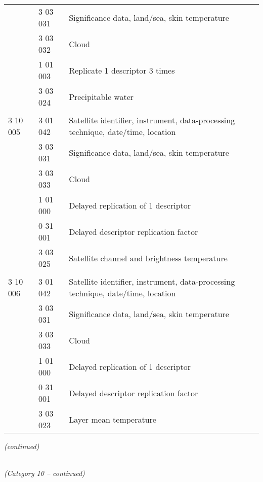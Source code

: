 \begin{longtable}[]{@{}llll@{}}
& 3 03 031 & Significance data, land/sea, skin temperature &\tabularnewline
& 3 03 032 & Cloud &\tabularnewline
& 1 01 003 & Replicate 1 descriptor 3 times &\tabularnewline
& 3 03 024 & Precipitable water &\tabularnewline
& & &\tabularnewline
3 10 005 & 3 01 042 & Satellite identifier, instrument, data-processing technique, date/time, location &\tabularnewline
& 3 03 031 & Significance data, land/sea, skin temperature &\tabularnewline
& 3 03 033 & Cloud &\tabularnewline
& 1 01 000 & Delayed replication of 1 descriptor &\tabularnewline
& 0 31 001 & Delayed descriptor replication factor &\tabularnewline
& 3 03 025 & Satellite channel and brightness temperature &\tabularnewline
& & &\tabularnewline
3 10 006 & 3 01 042 & Satellite identifier, instrument, data-processing technique, date/time, location &\tabularnewline
& 3 03 031 & Significance data, land/sea, skin temperature &\tabularnewline
& 3 03 033 & Cloud &\tabularnewline
& 1 01 000 & Delayed replication of 1 descriptor &\tabularnewline
& 0 31 001 & Delayed descriptor replication factor &\tabularnewline
& 3 03 023 & Layer mean temperature &\tabularnewline
\bottomrule
\end{longtable}

\emph{(continued)}

\emph{\\
(Category 10 -- continued)}

